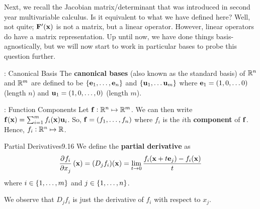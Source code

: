 \noindent Next, we recall the Jacobian matrix/determinant that was introduced in second year multivariable calculus. Is it equivalent to what we have defined here? Well, not quite; $\mathbf{F}'(\mathbf{x})$ is not a matrix, but a linear operator. However, linear operators do have a matrix representation. Up until now, we have done things basis-agnostically, but we will now start to work in particular bases to probe this question further.

\begin{ndef}{: Canonical Basis}{}
    The \textbf{canonical bases} (also known as the standard basis) of $\mathbb{R}^n$ and $\mathbb{R}^m$ are defined to be $\set{\ensuremath{\mathbf{e}}_1, \ldots, \ensuremath{\mathbf{e}}_n}$ and $\set{\ensuremath{\mathbf{u}}_1, \ldots \ensuremath{\mathbf{u}}_m}$ where $\mathbf{e}_1 = (1, 0, \ldots 0)$ (length $n$) and $\mathbf{u}_1 = (1, 0, \ldots, 0)$ (length $m$).
\end{ndef}

\begin{ndef}{: Function Components}{}
    Let $\mathbf{f}: \mathbb{R}^n \mapsto \mathbb{R}^m$. We can then write $\mathbf{f}(\mathbf{x}) = \sum_{i=1}^m f_i(\mathbf{x})\mathbf{u}_i$. So, $\mathbf{f} = (f_1, \ldots, f_n)$ where $f_i$ is the $i$th \textbf{component} of $\mathbf{f}$. Hence, $f_i: \mathbb{R}^n \mapsto \mathbb{R}$. 
\end{ndef}

\begin{definition}{Partial Derivatives}{9.16}
    We define the \textbf{partial derivative} as
    \begin{align*}
        \dpd{f_i}{x_j}(\v{x}) = (D_jf_i)(\v{x}) = \lim_{t \rightarrow 0} \frac{f_i(\v{x} + t\v{e}_j) - f_i(\v{x})}{t}
    \end{align*}
    where $i \in \set{1, \ldots, m}$ and $j \in \set{1, \ldots, n}$.
\end{definition}
\noindent We observe that $D_jf_i$ is just the derivative of $f_i$ with respect to $x_j$.

